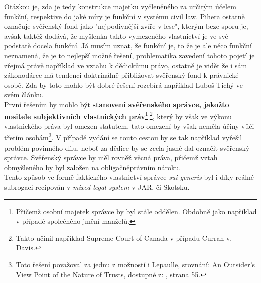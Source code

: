 \documentclass{article}
\begin{document}
Otázkou je, zda je tedy konstrukce majetku vyčleněného za určitým účelem funkční, respektive do jaké míry je funkční v systému civil law. Pihera ostatně označuje svěřenský fond jako "nejpodivnější zvíře v lese", kterým beze sporu je, avšak taktéž dodává, že myšlenka takto vymezeného vlastnictví je ve své podstatě docela funkční. Já musím uznat, že funkční je, to že je ale něco funkční neznamená, že je to nejlepší možné řešení, problematika zavedení tohoto pojetí je zřejmá právě například ve vztahu k dědickůmu právo, ostatně je vidět že i sám zákonodárce má tendenci doktrinálně přibližovat svěřenský fond k právnické osobě. Zda by toto mohlo být dobré řešení rozebírá například Luboš Tichý ve svém článku.\\

První řešením by mohlo být \textbf{stanovení svěřenského správce, jakožto nositele subjektivních vlastnických práv}\footnote{Přičemž osobní majetek správce by byl stále oddělen. Obdobně jako například v případě společného jmění manželů.}\textsuperscript{,}\footnote{Takto učinil například Supreme Court of Canada v případu Curran v. Davis.}, který by však ve výkonu vlastnického práva byl omezen statutem, tato omezení by však neměla účiny vůči třetím osobám\footnote{Toto řešení považoval za jednu z možností i Lepaulle, srovnání: An Outsider’s View Point of the Nature of Trusts, dostupné z: , strana 55.}. V případě vydání se touto cestou by se tak například vyřešil problém povinného dílu, neboť za dědice by se zcela jasně dal označit svěřenský správce. Svěřenský správce by měl rovněž věcná práva, přičemž vztah obmyšleného by byl založen na obligačněprávním nároku.\\

Tento způsob ve formě faktického vlastnictví správce \textit{sui generis} byl i díky reálné subrogaci recipován v \textit{mixed legal system} v JAR, či Skotsku.\\
\end{document}
